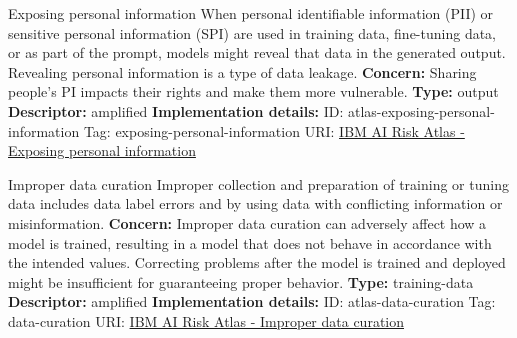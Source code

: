 \documentclass[a4paper,12pt]{article}
\begin{document}
\begin{definitionbox}{Exposing personal information}
When personal identifiable information (PII) or sensitive personal information (SPI) are used in training data, fine-tuning data, or as part of the prompt, models might reveal that data in the generated output. Revealing personal information is a type of data leakage.\newline\newline
\textbf{Concern: }Sharing people's PI impacts their rights and make them more vulnerable.\newline\newline
\textbf{Type: }output\newline
\textbf{Descriptor: }amplified \newline\newline
\textbf{Implementation details: } \newline
ID: atlas-exposing-personal-information \newline
Tag: exposing-personal-information \newline
URI:  \href{https://www.ibm.com/docs/en/watsonx/saas?topic=SSYOK8/wsj/ai-risk-atlas/exposing-personal-information.html}{IBM AI Risk Atlas - Exposing personal information}\newline
\end{definitionbox}
\begin{definitionbox}{Improper data curation}
Improper collection and preparation of training or tuning data includes data label errors and by using data with conflicting information or misinformation.\newline\newline
\textbf{Concern: }Improper data curation can adversely affect how a model is trained, resulting in a model that does not behave in accordance with the intended values. Correcting problems after the model is trained and deployed might be insufficient for guaranteeing proper behavior. \newline\newline
\textbf{Type: }training-data\newline
\textbf{Descriptor: }amplified \newline\newline
\textbf{Implementation details: } \newline
ID: atlas-data-curation \newline
Tag: data-curation \newline
URI:  \href{https://www.ibm.com/docs/en/watsonx/saas?topic=SSYOK8/wsj/ai-risk-atlas/data-curation.html}{IBM AI Risk Atlas - Improper data curation}\newline
\end{definitionbox}
\end{document}
